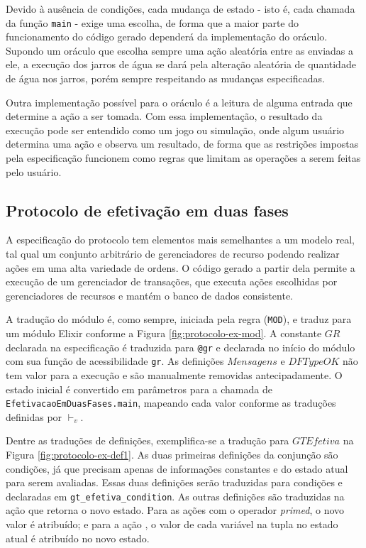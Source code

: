 Devido à ausência de condições, cada mudança de estado - isto é, cada chamada da
função \texttt{main} - exige uma escolha, de forma que a maior parte do
funcionamento do código gerado dependerá da implementação do oráculo. Supondo um
oráculo que escolha sempre uma ação aleatória entre as enviadas a ele, a
execução dos jarros de água se dará pela alteração aleatória de quantidade de
água nos jarros, porém sempre respeitando as mudanças especificadas.

Outra implementação possível para o oráculo é a leitura de alguma entrada que
determine a ação a ser tomada. Com essa implementação, o resultado da execução
pode ser entendido como um jogo ou simulação, onde algum usuário determina uma
ação e observa um resultado, de forma que as restrições impostas pela
especificação funcionem como regras que limitam as operações a serem feitas pelo
usuário.

\subsection{Protocolo de efetivação em duas fases}


A especificação do protocolo tem elementos mais semelhantes a um modelo real,
tal qual um conjunto arbitrário de gerenciadores de recurso podendo realizar
ações em uma alta variedade de ordens. O código gerado a partir dela permite a
execução de um gerenciador de transações, que executa ações escolhidas por
gerenciadores de recursos e mantém o banco de dados consistente.

A tradução do módulo é, como sempre, iniciada pela regra (\texttt{MOD}), e
traduz para um módulo Elixir conforme a Figura \ref{fig:protocolo-ex-mod}. A
constante $GR$ declarada na especificação é traduzida para \texttt{@gr} e
declarada no início do módulo com sua função de acessibilidade \texttt{gr}. As
definições $Mensagens$ e $DFTypeOK$ não tem valor para a execução e são
manualmente removidas antecipadamente. O
estado inicial é convertido em parâmetros para a chamada de
\texttt{EfetivacaoEmDuasFases.main}, mapeando cada valor conforme as traduções
definidas por $\vdash_v$.

Dentre as traduções de definições, exemplifica-se a tradução para
$GTEfetiva$ na Figura \ref{fig:protocolo-ex-def1}. As duas primeiras definições
da conjunção são condições, já que precisam apenas de informações constantes e
do estado atual para serem avaliadas. Essas duas definições serão traduzidas
para condições e declaradas em \texttt{gt\_efetiva\_condition}. As outras
definições são traduzidas na ação que retorna o novo estado. Para as ações com o
operador \textit{primed}, o novo valor é atribuído; e para a ação \UNCHANGED, o
valor de cada variável na tupla no estado atual é atribuído no novo estado.

